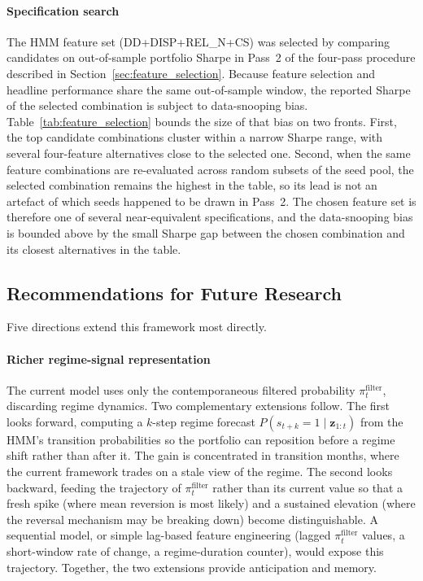 \bigskip\paragraph{Specification search}
The HMM feature set (DD+DISP+REL\_N+CS) was selected by comparing candidates on out-of-sample portfolio Sharpe in Pass~2 of the four-pass procedure described in Section~\ref{sec:feature_selection}. Because feature selection and headline performance share the same out-of-sample window, the reported Sharpe of the selected combination is subject to data-snooping bias. Table~\ref{tab:feature_selection} bounds the size of that bias on two fronts. First, the top candidate combinations cluster within a narrow Sharpe range, with several four-feature alternatives close to the selected one. Second, when the same feature combinations are re-evaluated across random subsets of the seed pool, the selected combination remains the highest in the table, so its lead is not an artefact of which seeds happened to be drawn in Pass~2. The chosen feature set is therefore one of several near-equivalent specifications, and the data-snooping bias is bounded above by the small Sharpe gap between the chosen combination and its closest alternatives in the table.

\subsection{Recommendations for Future Research}\label{sec:future_work}

Five directions extend this framework most directly.

\paragraph{Richer regime-signal representation}
The current model uses only the contemporaneous filtered probability $\pi_t^{\text{filter}}$, discarding regime dynamics. Two complementary extensions follow. The first looks forward, computing a $k$-step regime forecast $P(s_{t+k} = 1 \mid \mathbf{z}_{1:t})$ from the HMM's transition probabilities so the portfolio can reposition before a regime shift rather than after it. The gain is concentrated in transition months, where the current framework trades on a stale view of the regime. The second looks backward, feeding the trajectory of $\pi_t^{\text{filter}}$ rather than its current value so that a fresh spike (where mean reversion is most likely) and a sustained elevation (where the reversal mechanism may be breaking down) become distinguishable. A sequential model, or simple lag-based feature engineering (lagged $\pi_t^{\text{filter}}$ values, a short-window rate of change, a regime-duration counter), would expose this trajectory. Together, the two extensions provide anticipation and memory.


